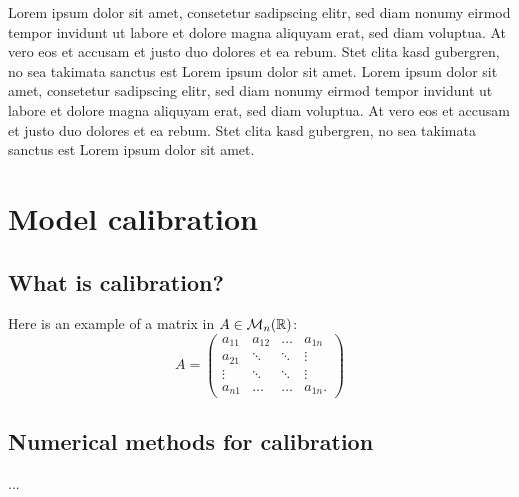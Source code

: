 Lorem ipsum dolor sit amet, consetetur sadipscing elitr, sed diam nonumy eirmod tempor invidunt ut labore et dolore magna aliquyam erat, sed diam voluptua. At vero eos et accusam et justo duo dolores et ea rebum. Stet clita kasd gubergren, no sea takimata sanctus est Lorem ipsum dolor sit amet. Lorem ipsum dolor sit amet, consetetur sadipscing elitr, sed diam nonumy eirmod tempor invidunt ut labore et dolore magna aliquyam erat, sed diam voluptua. At vero eos et accusam et justo duo dolores et ea rebum. Stet clita kasd gubergren, no sea takimata sanctus est Lorem ipsum dolor sit amet.


\section{Model calibration}
\subsection{What is calibration?}
Here is an example of a matrix\cite{website:fermentas-lambda} in $A\in\mathcal{M}_n(\mathbb{R})$:
$$
A = 
\begin{pmatrix}
a_{11} & a_{12} & \ldots & a_{1n}\\
a_{21} & \ddots & \ddots  & \vdots\\
\vdots &  \ddots & \ddots  & \vdots\\
a_{n1} &  \ldots &  \ldots & a_{1n}.
\end{pmatrix}
$$

\subsection{Numerical methods for calibration}
...


